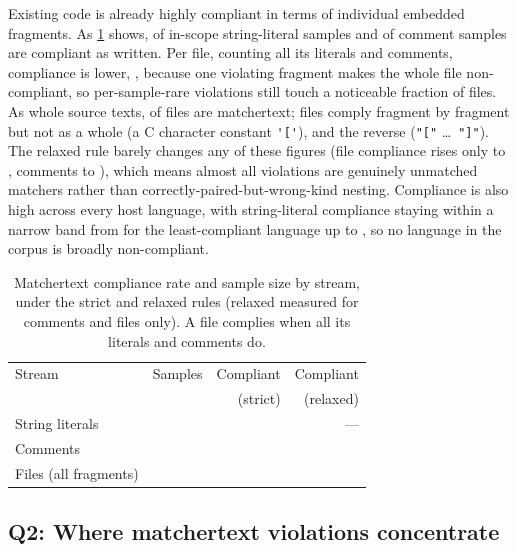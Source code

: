 Existing code is already highly compliant
in terms of individual embedded fragments.
As \cref{tab:eval:compliance} shows,
\dataStrCompliance of in-scope string-literal samples
and \dataDocCompliance of comment samples are compliant as written.
Per file, counting all its literals and comments, compliance is lower, \dataFileCompliance,
because one violating fragment makes the whole file non-compliant,
so per-sample-rare violations still touch a noticeable fraction of files.
As whole source texts, \dataWholeFileCompliance of files are matchertext;
\dataFilesFragmentsOnly files comply fragment by fragment
but not as a whole (\eg a C character constant \verb|'['|),
and \dataFilesWholeOnly the reverse (\eg \verb|"["| \dots\ \verb|"]"|).
The relaxed rule barely changes any of these figures
(file compliance rises only to \dataFileComplianceRelaxed,
comments to \dataDocComplianceRelaxed),
which means almost all violations are genuinely unmatched matchers
rather than correctly-paired-but-wrong-kind nesting.
Compliance is also high across every host language,
with string-literal compliance staying within a narrow band
from \dataHostComplianceMin for the least-compliant language up to \dataHostComplianceMax,
so no language in the corpus is broadly non-compliant.

\begin{table}[t]
\begin{center}
\begin{footnotesize}
\begin{tabular}{lrrr}
\hline
Stream		& Samples	& Compliant	& Compliant	\\
		&		& (strict)	& (relaxed)	\\
\hline
String literals	& \dataStrSamplesShort	& \dataStrCompliance	& ---		\\
Comments	& \dataDocSamplesShort	& \dataDocCompliance	& \dataDocComplianceRelaxed	\\
Files (all fragments)	& \dataFilesShort	& \dataFileCompliance	& \dataFileComplianceRelaxed	\\
\hline
\end{tabular}
\end{footnotesize}
\end{center}
\caption{Matchertext compliance rate and sample size by stream,
	under the strict and relaxed rules (relaxed measured for comments and files only).
	A file complies when all its literals and comments do.}
\label{tab:eval:compliance}
\end{table}


\subsection{Q2: Where matchertext violations concentrate}
\label{sec:eval:where}

